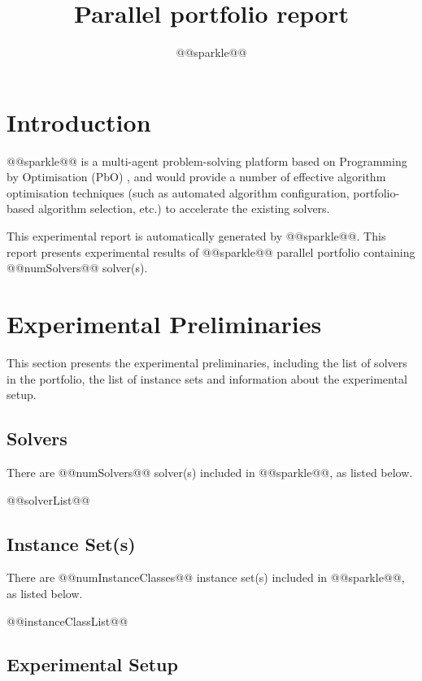\documentclass[british]{article}
\title{ Parallel portfolio report}
\author{ @@sparkle@@ }
\begin{document}
\maketitle %


\section{Introduction}
\label{sec:Introduction}

@@sparkle@@ \cite{Hoos15} is a multi-agent problem-solving platform based on Programming by Optimisation (PbO) \cite{Hoos12}, and would provide a number of effective algorithm optimisation techniques (such as automated algorithm configuration, portfolio-based algorithm selection, etc.) to accelerate the existing solvers.

This experimental report is automatically generated by @@sparkle@@. This report presents experimental results of @@sparkle@@ parallel portfolio containing @@numSolvers@@ solver(s).

\section{Experimental Preliminaries}
\label{sec:Experimental_Preliminaries}

This section presents the experimental preliminaries, including the list of solvers in the portfolio, the list of instance sets and information about the experimental setup.

\subsection{Solvers}
\label{sec:Solvers}
There are @@numSolvers@@ solver(s) included in @@sparkle@@, as listed below.

\begin{enumerate} 
@@solverList@@
\end{enumerate}

\subsection{Instance Set(s)}
\label{sec:Instance_Sets}
There are @@numInstanceClasses@@ instance set(s) included in @@sparkle@@, as listed below.

\begin{enumerate}
@@instanceClassList@@
\end{enumerate}

\subsection{Experimental Setup}
\label{sec:Experimental_Setup}
\end{document}
